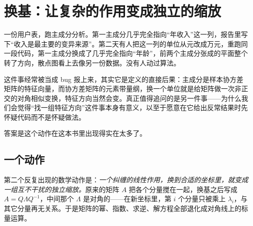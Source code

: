 \section{换基：让复杂的作用变成独立的缩放}
\label{sec:17-Synthesis/02-Recurring-Ideas/02}

一份用户表，跑主成分分析。第一主成分几乎完全指向``年收入''这一列，报告里写下``收入是最主要的变异来源''。第二天有人把这一列的单位从元改成万元，重跑同一段代码，第一主成分换成了几乎完全指向``年龄''，前两个主成分张成的平面整个转了方向，散点图看上去像另一份数据。没有人动过算法。

这件事经常被当成 bug 报上来，其实它是定义的直接后果：主成分是样本协方差矩阵的特征向量，而协方差矩阵的元素带量纲，换一个单位就是给矩阵做一次非正交的对角相似变换，特征方向当然会变。真正值得追问的是另一件事——为什么我们会觉得``找一组特征方向''这件事本身有意义，以至于愿意在它给出反常结果时先怀疑代码而不是怀疑做法。

答案是这个动作在这本书里出现得实在太多了。

\subsection{一个动作}

第二个反复出现的数学动作是：\emph{一个纠缠的线性作用，换到合适的坐标里，就变成一组互不干扰的独立缩放。}原来的矩阵 \(A\) 把各个分量搅在一起，换基之后写成 \(A = Q\Lambda Q^{-1}\)，中间那个 \(\Lambda\) 是对角的——在新坐标里，第 \(i\) 个分量只被乘上 \(\lambda_i\)，与其它分量再无关系。于是矩阵的幂、指数、求逆、解方程全部退化成对角线上的标量运算。

